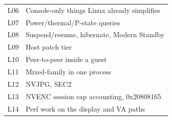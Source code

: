 {\begin{longtable}{@{}p{38mm}p{117mm}@{}}
L06 & Console-only things Linux already simplifies \\
L07 & Power/thermal/P-state queries \\
L08 & Suspend/resume, hibernate, Modern Standby \\
L09 & Host patch tier \\
L10 & Peer-to-peer inside a guest \\
L11 & Mixed-family in one process \\
L12 & NVJPG, SEC2 \\
L13 & NVENC session cap accounting, 0x20808165 \\
L14 & Perf work on the display and VA paths \\
\bottomrule
\end{longtable}}

